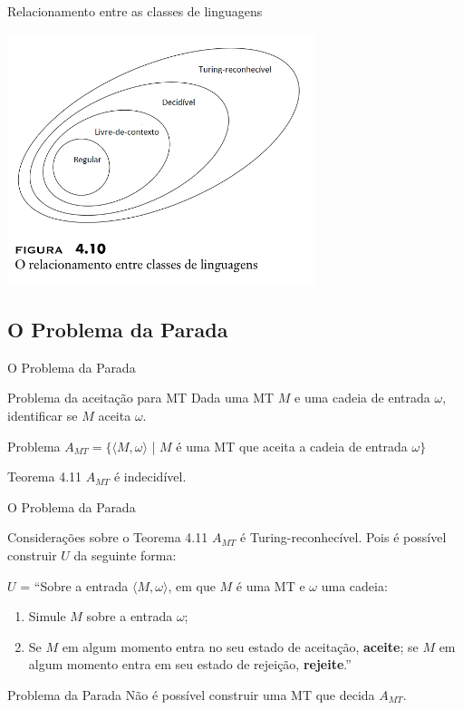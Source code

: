 \documentclass[xcolor=dvipsnames,table]{beamer}
\begin{document}
	\begin{frame}{Relacionamento entre as classes de linguagens}
		\begin{center}
			\includegraphics[width=9cm]{images/fig410.png}
		\end{center}
	\end{frame}
	
	\subsection{O Problema da Parada}
	\begin{frame}{O Problema da Parada}
		\begin{block}{Problema da aceitação para MT}
			Dada uma MT $M$ e uma cadeia de entrada $\omega$, identificar se $M$ aceita $\omega$.
		\end{block}	 
		\begin{block}{Problema}
			$A_{MT} = \{ \langle M, \omega \rangle$  | $M$ é uma MT que aceita a cadeia de entrada $\omega \}$
		\end{block}  
		\begin{alertblock}{Teorema 4.11}
			$A_{MT}$ é indecidível.
		\end{alertblock}
	\end{frame}
	
	\begin{frame}{O Problema da Parada}
		\begin{block}{Considerações sobre o Teorema 4.11}
			$A_{MT}$ é Turing-reconhecível. Pois é possível construir $U$ da seguinte forma:  
			
			$U$ = ``Sobre a entrada $\langle M, \omega \rangle$, em que $M$ é uma MT e $\omega$ uma cadeia:
			\begin{enumerate}
				\item Simule $M$ sobre a entrada $\omega$;
				\item Se $M$ em algum momento entra no seu estado de aceitação, {\bf aceite}; se $M$ em algum momento entra em seu estado de rejeição, {\bf rejeite}.''
			\end{enumerate}
		\end{block}	 
		\begin{alertblock}{Problema da Parada}
			Não é possível construir uma MT que decida $A_{MT}$.
		\end{alertblock} 
	\end{frame}
	
\end{document}
